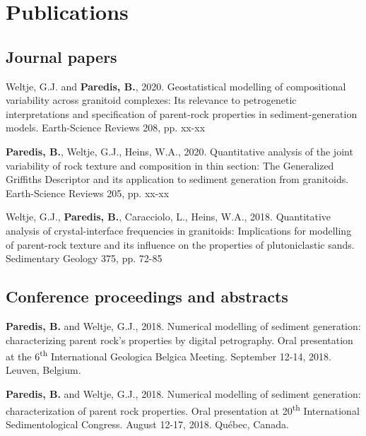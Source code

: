 \chapter*{Publications}\label{ch:publications}

\frenchspacing

\section*{Journal papers}

    Weltje, G.J. and \textbf{Paredis, B.}, %
    2020. %
    Geostatistical modelling of compositional variability across granitoid complexes: Its relevance to petrogenetic interpretations and specification of parent-rock properties in sediment-generation models. %
    Earth-Science Reviews 208, %
    pp. xx-xx %

    \textbf{Paredis, B.}, Weltje, G.J., Heins, W.A., %
    2020. %
    Quantitative analysis of the joint variability of rock texture and composition in thin section: The Generalized Griffiths Descriptor and its application to sediment generation from granitoids. %
    Earth-Science Reviews 205, %
    pp. xx-xx %

    Weltje, G.J., \textbf{Paredis, B.}, Caracciolo, L., Heins, W.A., %
    2018. %
    Quantitative analysis of crystal-interface frequencies in granitoids: Implications for modelling of parent-rock texture and its influence on the properties of plutoniclastic sands. %
    Sedimentary Geology 375, %
    pp. 72-85 %


\section*{Conference proceedings and abstracts}

    \textbf{Paredis, B.} and Weltje, G.J., %
    2018. %
    Numerical modelling of sediment generation: characterizing parent rock’s properties by digital petrography. %
    Oral presentation at the 6\textsuperscript{th} International Geologica Belgica Meeting. %
    September 12-14, 2018. %
    Leuven, Belgium. %

    \textbf{Paredis, B.} and Weltje, G.J., %
    2018. %
    Numerical modelling of sediment generation: characterization of parent rock properties. %
    Oral presentation at 20\textsuperscript{th} International Sedimentological Congress. %
    August 12-17, 2018. %
    Québec, Canada. %

